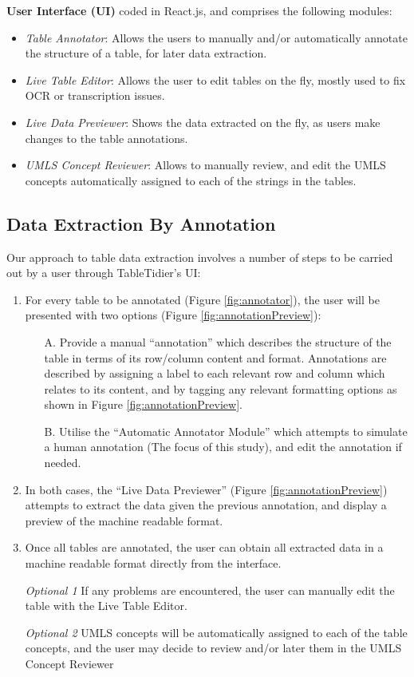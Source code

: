 \documentclass[10.7pt,]{article}
\begin{document}
\textbf{User Interface (UI)} coded in React.js, and comprises the following modules:
	\begin{itemize}
		\item \textit{Table Annotator}: Allows the users to manually and/or automatically annotate the structure of a table, for later data extraction.
		\item \textit{Live Table Editor}: Allows the user to edit tables on the fly, mostly used to fix OCR or transcription issues.
		\item \textit{Live Data Previewer}: Shows the data extracted on the fly, as users make changes to the table annotations.
		\item \textit{UMLS Concept Reviewer}: Allows to manually review, and edit the UMLS concepts automatically assigned to each of the strings in the tables.
	\end{itemize}	
	

\subsection{Data Extraction By Annotation}
Our approach to table data extraction involves a number of steps to be carried out by a user through TableTidier's UI:

\begin{enumerate}
	\item For every table to be annotated (Figure \ref{fig:annotator}), the user will be presented with two options (Figure \ref{fig:annotationPreview}):
	\begin{enumerate}
		\item[A.] Provide a manual ``annotation'' which describes the structure of the table in terms of its row/column content and format. Annotations are described by assigning a label to each relevant row and column which relates to its content, and by tagging any relevant formatting options as shown in Figure \ref{fig:annotationPreview}.
		\item[B.] Utilise the ``Automatic Annotator Module'' which attempts to simulate a human annotation (The focus of this study), and edit the annotation if needed.
	\end{enumerate}	
	\item In both cases, the ``Live Data Previewer'' (Figure \ref{fig:annotationPreview}) attempts to extract the data given the previous annotation, and display a preview of the machine readable format.
	\item Once all tables are annotated, the user can obtain all extracted data in a machine readable format directly from the interface.
	\item[\textit{Optional 1}] If any problems are encountered, the user can manually edit the table with the Live Table Editor.
	\item[\textit{Optional 2}] UMLS concepts will be automatically assigned to each of the table concepts, and the user may decide to review and/or later them in the UMLS Concept Reviewer
\end{enumerate}
\end{document}

